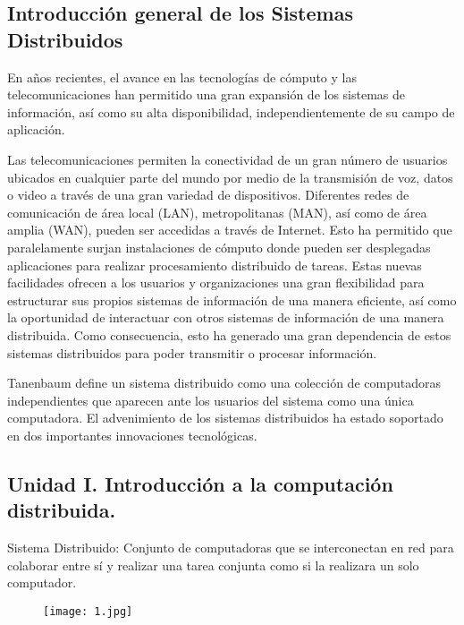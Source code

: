 {\raggedright
\subsection{Introducción general de los Sistemas Distribuidos}
}

En años recientes, el avance en las tecnologías de cómputo y las telecomunicaciones han permitido una gran expansión de los sistemas de información, así como su alta disponibilidad, independientemente de su campo de aplicación.

Las telecomunicaciones permiten la conectividad de un gran número de usuarios ubicados en cualquier parte del mundo por medio de la transmisión de voz, datos o video a través de una gran variedad de dispositivos. Diferentes redes de comunicación de área local (LAN), metropolitanas (MAN), así como de área amplia (WAN), pueden ser accedidas a través de Internet. Esto ha permitido que paralelamente surjan instalaciones de cómputo donde pueden ser desplegadas aplicaciones para realizar procesamiento distribuido de tareas. Estas nuevas facilidades ofrecen a los usuarios y organizaciones una gran flexibilidad para estructurar sus propios sistemas de información de una manera eficiente, así como la oportunidad de interactuar con otros sistemas de información de una manera distribuida. Como consecuencia, esto ha generado una gran dependencia de estos sistemas distribuidos para poder transmitir o procesar información.

Tanenbaum define un sistema distribuido como una colección de computadoras independientes que aparecen ante los usuarios del sistema como una única computadora. El advenimiento de los sistemas distribuidos ha estado soportado en dos importantes innovaciones tecnológicas.

\begin{center}
\section{Unidad I. Introducción a la computación distribuida.}
\end{center}

Sistema Distribuido: Conjunto de computadoras que se interconectan en red para colaborar entre sí y realizar una tarea conjunta como si la realizara un solo computador.

\begin{figure}[h!]
		\centering
		{\texttt{[image: 1.jpg]}\par} \vspace{1cm}
\end{figure}

